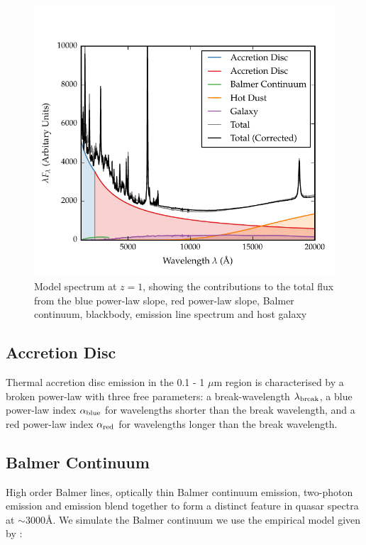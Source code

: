 \begin{figure}
  \centering
  \includegraphics[width=\textwidth]{figures/chapter05/sed_model.pdf}
  \caption{Model spectrum at $z=1$, showing the contributions to the total flux from the blue power-law slope, red power-law slope, Balmer continuum, blackbody, emission line spectrum and host galaxy}
  \label{fig:modelsed}
\end{figure}


\subsection{Accretion Disc}

Thermal accretion disc emission in the 0.1 - 1 $\mu$m region is characterised by a broken power-law with three free parameters: a break-wavelength $\lambda_{\rm break}$, a blue power-law index $\alpha_{\rm blue}$ for wavelengths shorter than the break wavelength, and a red power-law index $\alpha_{\rm red}$ for wavelengths longer than the break wavelength.

\subsection{Balmer Continuum}

High order Balmer lines, optically thin Balmer continuum emission, two-photon emission and  emission blend together to form a distinct feature in quasar spectra at $\sim3000$\AA. 
We simulate the Balmer continuum we use the empirical model given by \citet{grandi82}: 

